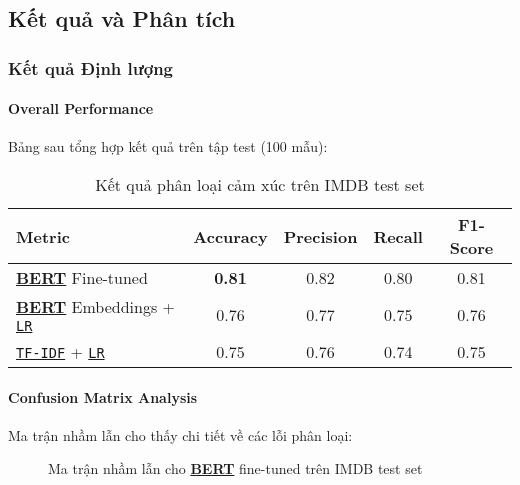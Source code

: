     \subsection{Kết quả và Phân tích}
    \label{ssec:ket_qua_phan_tich}
    
    \subsubsection{Kết quả Định lượng}
    
    \paragraph{Overall Performance}
    Bảng sau tổng hợp kết quả trên tập test (100 mẫu):
    
    \begin{table}[H]
    \centering
    \caption{Kết quả phân loại cảm xúc trên IMDB test set}
    \label{tab:results_summary}
    \begin{tabular}{lcccc}
    \toprule
    \textbf{Metric} & \textbf{Accuracy} & \textbf{Precision} & \textbf{Recall} & \textbf{F1-Score} \\
    \midrule
    \hyperref[acro:bert]{\textbf{BERT}} Fine-tuned & \textbf{0.81} & 0.82 & 0.80 & 0.81 \\
    \hyperref[acro:bert]{\textbf{BERT}} Embeddings + \hyperref[acro:lr]{\texttt{LR}} & 0.76 & 0.77 & 0.75 & 0.76 \\
    \hyperref[acro:tfidf]{\texttt{TF-IDF}} + \hyperref[acro:lr]{\texttt{LR}} & 0.75 & 0.76 & 0.74 & 0.75 \\
    \bottomrule
    \end{tabular}
    \end{table}
    
    \paragraph{Confusion Matrix Analysis}
    Ma trận nhầm lẫn cho thấy chi tiết về các lỗi phân loại:
    
    \begin{figure}[H]
    \centering
    \caption{Ma trận nhầm lẫn cho \hyperref[acro:bert]{\textbf{BERT}} fine-tuned trên IMDB test set}
    \label{fig:confusion_matrix}
    \end{figure}
    
